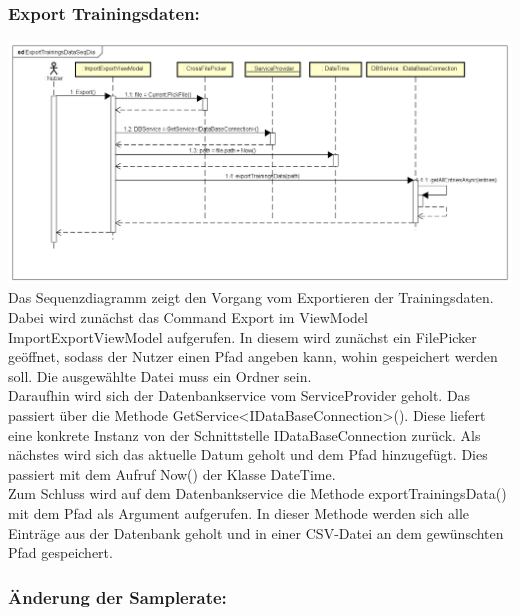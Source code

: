 \documentclass[a4paper,12pt]{article}
\begin{document}
\subsubsection{Export Trainingsdaten:}
\includegraphics[width=1.1\textwidth]{./Diagramme/TrainingsDatenExport_Sequenz.png}\\

Das Sequenzdiagramm zeigt den Vorgang vom Exportieren der Trainingsdaten. 
Dabei wird zunächst das Command Export im ViewModel ImportExportViewModel aufgerufen. In diesem wird zunächst ein FilePicker geöffnet, sodass der Nutzer einen Pfad angeben kann, wohin gespeichert werden soll. 
Die ausgewählte Datei muss ein Ordner sein. \\
Daraufhin wird sich der Datenbankservice vom ServiceProvider geholt. Das passiert über die Methode GetService<IDataBaseConnection>(). Diese liefert eine konkrete Instanz von der Schnittstelle IDataBaseConnection zurück.
Als nächstes wird sich das aktuelle Datum geholt und dem Pfad hinzugefügt. Dies passiert mit dem Aufruf Now() der Klasse DateTime.\\
Zum Schluss wird auf dem Datenbankservice die Methode exportTrainingsData() mit dem Pfad als Argument aufgerufen. In dieser Methode werden sich alle Einträge aus der Datenbank geholt und in einer \gls{CSV}-Datei an dem gewünschten Pfad gespeichert.\\

\subsubsection{Änderung der Samplerate:}
\end{document}
